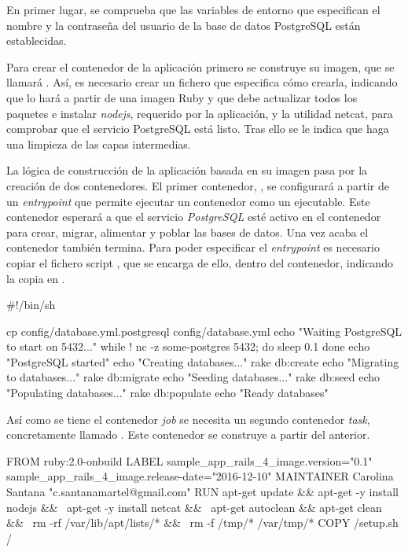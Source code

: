 En primer lugar, se comprueba que las variables de entorno que especifican el nombre y la contraseña del usuario de la base de datos PostgreSQL están establecidas.

Para crear el contenedor de la aplicación primero se construye su imagen, que se llamará . Así, es necesario crear un fichero  que especifica cómo crearla, indicando que lo hará a partir de una imagen Ruby y que debe actualizar todos los paquetes e instalar \textit{nodejs}, requerido por la aplicación, y la utilidad netcat, para comprobar que el servicio PostgreSQL está listo. Tras ello se le indica que haga una limpieza de las capas intermedias. 

La lógica de construcción de la aplicación basada en su imagen pasa por la creación de dos contenedores. El primer contenedor, , se configurará a partir de un \textit{entrypoint} que permite ejecutar un contenedor como un ejecutable. Este contenedor esperará a que el servicio \textit{PostgreSQL} esté activo en el contenedor  para crear, migrar, alimentar y poblar las bases de datos. Una vez acaba el contenedor también termina. Para poder especificar el \textit{entrypoint} es necesario copiar el fichero script , que se encarga de ello, dentro del contenedor, indicando la copia en . 

\begin{codelisting}
\label{code:dockerfile}
\begin{code}
#!/bin/sh

cp config/database.yml.postgresql config/database.yml
echo "Waiting PostgreSQL to start on 5432..."
while ! nc -z some-postgres 5432; do
  sleep 0.1
done
echo "PostgreSQL started"
echo "Creating databases..."
rake db:create
echo "Migrating to databases..."
rake db:migrate
echo "Seeding databases..."
rake db:seed
echo "Populating databases..."
rake db:populate
echo "Ready databases"
\end{code}
\end{codelisting}

Así como se tiene el contenedor \textit{job} se necesita un segundo contenedor \textit{task}, concretamente llamado . Este contenedor se construye a partir del anterior.

\begin{codelisting}
\label{code:dockerfile}
\begin{code}
FROM ruby:2.0-onbuild
LABEL sample_app_rails_4_image.version="0.1" 
      sample_app_rails_4_image.release-date="2016-12-10"
MAINTAINER Carolina Santana "c.santanamartel@gmail.com"
RUN apt-get update && apt-get -y install nodejs && \
    apt-get -y install netcat && \
    apt-get autoclean && apt-get clean && \
    rm -rf /var/lib/apt/lists/* && \
    rm -f /tmp/* /var/tmp/*
COPY /setup.sh /
\end{code}
\end{codelisting}

